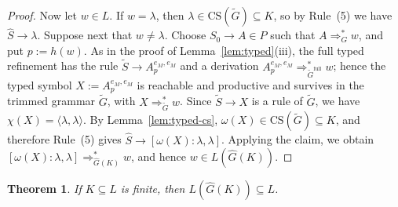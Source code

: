 \documentclass[11pt,a4paper]{article}
\newtheorem{theorem}{Theorem}[section]
\newcommand{\CS}{\mathrm{CS}}
\begin{document}
\begin{proof}
Now let $w\in L$. If $w=\lambda$, then
$\lambda\in\CS(\widetilde G)\subseteq K$, so by Rule~\textup{(5)} we
have $\hat S\to\lambda$. Suppose next that $w\neq\lambda$. Choose
$S_0\to A\in P$ such that $A\Rightarrow_G^* w$, and put $p:=h(w)$. As
in the proof of Lemma~\ref{lem:typed}\textup{(iii)}, the full typed
refinement has the rule $\widetilde S\to A_p^{e_M,e_M}$ and a derivation
$A_p^{e_M,e_M}\Rightarrow_{\widetilde G^{\mathrm{full}}}^* w$; hence
the typed symbol $X:=A_p^{e_M,e_M}$ is reachable and productive and
survives in the trimmed grammar $\widetilde G$, with
$X\Rightarrow_{\widetilde G}^* w$. Since $\widetilde S\to X$ is a rule
of $\widetilde G$, we have $\chi(X)=\langle\lambda,\lambda\rangle$.
By Lemma~\ref{lem:typed-cs}, $\omega(X)\in\CS(\widetilde G)\subseteq K$,
and therefore Rule~\textup{(5)} gives
$\hat S\to[\omega(X):\lambda,\lambda]$. Applying the claim, we obtain
$[\omega(X):\lambda,\lambda]\Rightarrow_{\hat G(K)}^* w$, and hence
$w\in L(\hat G(K))$.
\end{proof}

\begin{theorem}
\label{thm:soundness}
If $K\subseteq L$ is finite, then $L(\hat G(K))\subseteq L$.
\end{theorem}
\end{document}
